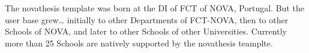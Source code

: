 \makeatletter
\newcommand{\ntSchool}[3]{%
    \setlength{\fboxsep}{0pt}%
    \def\myspace{}%
    \gape{
    \@for\listitem:=#1\do{%
      \myspace\fbox{\colorbox{White}{\texttt{[image: \\listitem]}}}%
      \def\myspace{~}%
    }}%
    &
    \parbox[c]{\linewidth}{
      \StrCut{#2}{;}\schlname\@remainder%
      \StrCut{\@remainder}{;}\schlacrn\schlurl%
      \textbf{\schlname\IfStrEq{\schlacrn}{}{}{\ \href{\schlurl}{(\schlacrn)}\newline}}
      \def\mynewline{\hspace*{2em}}\small
      \@for\listitem:=#3\do{%
        \StrCut{\listitem}{;}\schlname\@remainder%
        \StrCut{\@remainder}{;}\schlacrn\schlurl%
        \mynewline\schlname\IfStrEq{\schlacrn}{}{}{\ \href{\schlurl}{(\schlacrn)}}%
        \def\mynewline{\newline\hspace*{2em}}
    }}\\
}
\makeatother

\newenvironment{ntUniversity}[1]{
  \renewcommand\cellgape{\Gape[5pt]}
  \rowcolors{1}{}{GhostWhite}
    \xltabular{\linewidth}{cX}%
    \toprule%
    \rowcolor{Gainsboro}%
    & \Gape[1.5ex]{\thead[l]{#1}}\\
    \midrule%
}{%
    \bottomrule
    \endxltabular%
}

The \gls{novathesis} template was born at the \gls{DI} of  \gls{FCT} of \gls{NOVA}, Portugal.  But the user base grew… initially to other Departments of FCT-NOVA, then to other Schools of NOVA, and later to other Schools of other Universities.  Currently more than 25 Schools are natively supported by the \gls{novathesis} teamplte.

